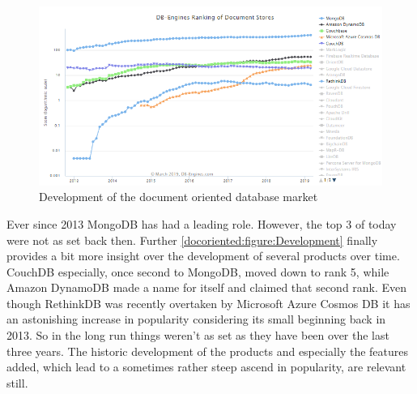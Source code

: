 \begin{figure}
    \centering
    \includegraphics[width=\textwidth]{img/dbRankedTrend.png}
    \caption{Development of the document oriented database market}
    \label{docoriented:figure:Development}
\end{figure}

Ever since 2013 MongoDB has had a leading role. However, the top 3 of today were not as set back then. Further \autoref{docoriented:figure:Development} finally provides a bit more insight over the development of several products over time. CouchDB especially, once second to MongoDB, moved down to rank 5, while Amazon DynamoDB made a name for itself and claimed that second rank. Even though RethinkDB was recently overtaken by Microsoft Azure Cosmos DB it has an astonishing increase in popularity considering its small beginning back in 2013. So in the long run things weren't as set as they have been over the last three years. The historic development of the products and especially the features added, which lead to a sometimes rather steep ascend in popularity, are relevant still.

